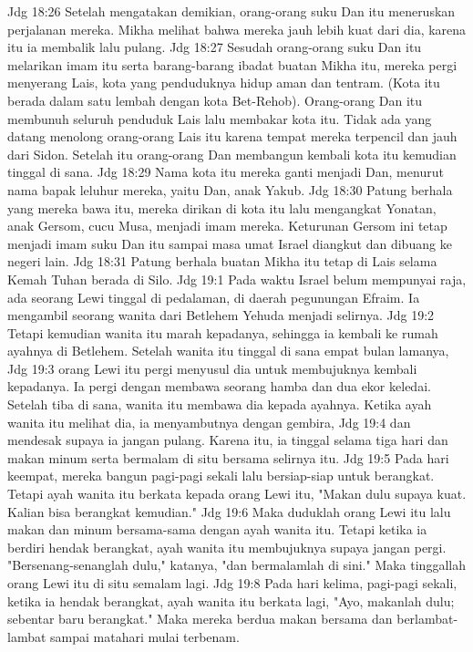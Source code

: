 Jdg 18:26  Setelah mengatakan demikian, orang-orang suku Dan itu meneruskan perjalanan mereka. Mikha melihat bahwa mereka jauh lebih kuat dari dia, karena itu ia membalik lalu pulang.
Jdg 18:27  Sesudah orang-orang suku Dan itu melarikan imam itu serta barang-barang ibadat buatan Mikha itu, mereka pergi menyerang Lais, kota yang penduduknya hidup aman dan tentram. (Kota itu berada dalam satu lembah dengan kota Bet-Rehob). Orang-orang Dan itu membunuh seluruh penduduk Lais lalu membakar kota itu. Tidak ada yang datang menolong orang-orang Lais itu karena tempat mereka terpencil dan jauh dari Sidon. Setelah itu orang-orang Dan membangun kembali kota itu kemudian tinggal di sana.
Jdg 18:29  Nama kota itu mereka ganti menjadi Dan, menurut nama bapak leluhur mereka, yaitu Dan, anak Yakub.
Jdg 18:30  Patung berhala yang mereka bawa itu, mereka dirikan di kota itu lalu mengangkat Yonatan, anak Gersom, cucu Musa, menjadi imam mereka. Keturunan Gersom ini tetap menjadi imam suku Dan itu sampai masa umat Israel diangkut dan dibuang ke negeri lain.
Jdg 18:31  Patung berhala buatan Mikha itu tetap di Lais selama Kemah Tuhan berada di Silo.
Jdg 19:1  Pada waktu Israel belum mempunyai raja, ada seorang Lewi tinggal di pedalaman, di daerah pegunungan Efraim. Ia mengambil seorang wanita dari Betlehem Yehuda menjadi selirnya.
Jdg 19:2  Tetapi kemudian wanita itu marah kepadanya, sehingga ia kembali ke rumah ayahnya di Betlehem. Setelah wanita itu tinggal di sana empat bulan lamanya,
Jdg 19:3  orang Lewi itu pergi menyusul dia untuk membujuknya kembali kepadanya. Ia pergi dengan membawa seorang hamba dan dua ekor keledai. Setelah tiba di sana, wanita itu membawa dia kepada ayahnya. Ketika ayah wanita itu melihat dia, ia menyambutnya dengan gembira,
Jdg 19:4  dan mendesak supaya ia jangan pulang. Karena itu, ia tinggal selama tiga hari dan makan minum serta bermalam di situ bersama selirnya itu.
Jdg 19:5  Pada hari keempat, mereka bangun pagi-pagi sekali lalu bersiap-siap untuk berangkat. Tetapi ayah wanita itu berkata kepada orang Lewi itu, "Makan dulu supaya kuat. Kalian bisa berangkat kemudian."
Jdg 19:6  Maka duduklah orang Lewi itu lalu makan dan minum bersama-sama dengan ayah wanita itu. Tetapi ketika ia berdiri hendak berangkat, ayah wanita itu membujuknya supaya jangan pergi. "Bersenang-senanglah dulu," katanya, "dan bermalamlah di sini." Maka tinggallah orang Lewi itu di situ semalam lagi.
Jdg 19:8  Pada hari kelima, pagi-pagi sekali, ketika ia hendak berangkat, ayah wanita itu berkata lagi, "Ayo, makanlah dulu; sebentar baru berangkat." Maka mereka berdua makan bersama dan berlambat-lambat sampai matahari mulai terbenam.
